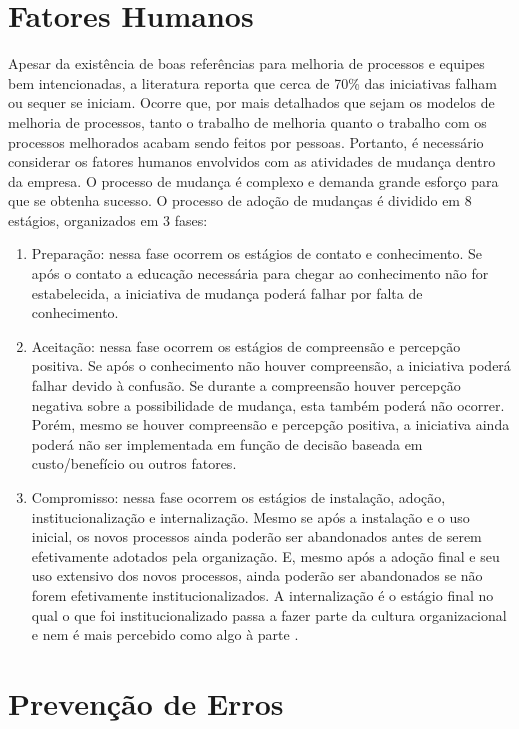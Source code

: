 \documentclass[12pt]{article}
\begin{document}
\section{Fatores Humanos}
Apesar da existência de boas referências para melhoria de processos e equipes bem intencionadas, a literatura reporta que cerca de 70\% das iniciativas falham ou sequer se iniciam. Ocorre que, por mais detalhados que sejam os modelos de melhoria de processos, tanto o trabalho de melhoria quanto o trabalho com os processos melhorados acabam sendo feitos por pessoas. Portanto, é necessário considerar os fatores humanos envolvidos com as atividades de mudança dentro da empresa. O processo de mudança é complexo e demanda grande esforço para que se obtenha sucesso. O processo de adoção de mudanças é dividido em 8 estágios, organizados em 3 fases:
\begin{enumerate}
    \item Preparação: nessa fase ocorrem os estágios de contato e conhecimento. Se após o contato a educação necessária para chegar ao conhecimento não for estabelecida, a iniciativa de mudança poderá falhar por falta de conhecimento.
    \item Aceitação: nessa fase ocorrem os estágios de compreensão e percepção positiva. Se após o conhecimento não houver compreensão, a iniciativa poderá falhar devido à confusão. Se durante a compreensão houver percepção negativa sobre a possibilidade de mudança, esta também poderá não ocorrer. Porém, mesmo se houver compreensão e percepção positiva, a iniciativa ainda poderá não ser implementada em função de decisão baseada em custo/benefício ou outros fatores.
    \item Compromisso: nessa fase ocorrem os estágios de instalação, adoção, institucionalização e internalização. Mesmo se após a instalação e o uso inicial, os novos processos ainda poderão ser abandonados antes de serem efetivamente adotados pela organização. E, mesmo após a adoção final e seu uso extensivo dos novos processos, ainda poderão ser abandonados se não forem efetivamente institucionalizados. A internalização é o estágio final no qual o que foi institucionalizado passa a fazer parte da cultura organizacional e nem é mais percebido como algo à parte \cite{sommerville2007engenharia}.
\end{enumerate}

\section{Prevenção de Erros}
\end{document}
